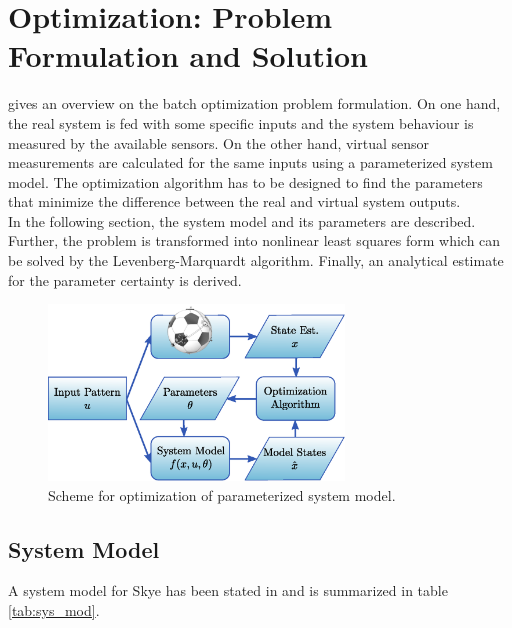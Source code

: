 \chapter{Optimization: Problem Formulation and Solution}
\label{chap:batch}

 gives an overview on the batch optimization problem formulation.
On one hand, the real system is fed with some specific inputs and the system behaviour is measured by the available sensors.
On the other hand, virtual sensor measurements are calculated for the same inputs using a parameterized system model.
The optimization algorithm has to be designed to find the parameters that minimize the difference between the real and virtual system outputs.
\\


In the following section, the system model and its parameters are described.
Further, the problem is transformed into nonlinear least squares form which can be solved by the Levenberg-Marquardt algorithm. Finally, an analytical estimate for the parameter certainty is derived.

\begin{figure}[btp]
\captionsetup{width=0.9\textwidth}
\centering
\includegraphics[width=0.7\textwidth]{images/problem_formulation.eps}
\caption{Scheme for optimization of parameterized system model.}
\label{fig:batch_opti}
\end{figure}

\section{System Model}
\label{sec:system_model}
A system model for Skye has been stated in \citep{Weichart2012} and is summarized in table \ref{tab:sys_mod}.

